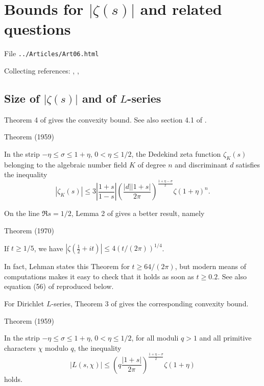 \chapter{   Bounds for $|\zeta(s)|$ and related questions}

File \texttt{../Articles/Art06.html}









Collecting references:
\cite{Trudgian*11},
\cite{Kadiri-Ng*12},

 
 


\section{Size of $|\zeta(s)|$ and of $L$-series
}



Theorem 4 of \cite{Rademacher*59} gives
the convexity bound. See also section 4.1 of \cite{Trudgian*13}.

\begin{thm}{Theorem (1959)}

In the strip $-\eta\le \sigma\le 1+\eta$, $0 < \eta\le 1/2$, the Dedekind zeta
function $\zeta_K(s)$ belonging to the algebraic number field $K$ of degree
$n$ and discriminant $d$ satisfies the inequality
$$
|\zeta_K(s)|\le 3 \left|\frac{1+s}{1-s}\right|
\left(\frac{|d||1+s|}{2\pi}\right)^{\frac{1+\eta-\sigma}{2}}
\zeta(1+\eta)^n.
$$
\end{thm}


On the line $\Re s=1/2$, Lemma 2 of
\cite{Lehman*70} gives a better
result, namely

\begin{thm}{Theorem (1970)}

If $t\ge 1/5$, we have
$
|\zeta(\tfrac12+it)|\le 4 (t/(2\pi))^{1/4}
$.
\end{thm}

In fact, Lehman states this Theorem for $t\ge 64/(2\pi)$, but modern means of
computations makes it easy to check that it holds as soon as $t\ge 0.2$.
See also equation (56)
of \cite{Backlund*18} reproduced below.

For Dirichlet $L$-series, Theorem 3
of \cite{Rademacher*59} gives 
the corresponding convexity bound.

\begin{thm}{Theorem (1959)}

In the strip $-\eta\le \sigma\le 1+\eta$, $0 < \eta\le 1/2$, for all moduli $q
> 1$ and all primitive
characters $\chi$ modulo $q$, the inequality 
$$
|L(s,\chi)|\le  
\left(q\frac{|1+s|}{2\pi}\right)^{\frac{1+\eta-\sigma}{2}}
\zeta(1+\eta)
$$
holds.
\end{thm}

